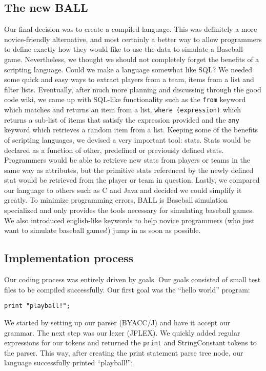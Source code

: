 \subsection{The new BALL}
Our final decision was to create a compiled language. This was
definitely a more novice-friendly alternative, and most certainly a
better way to allow programmers to define exactly how they would like
to use the data to simulate a Baseball game. Nevertheless, we thought
we should not completely forget the benefits of a scripting
language. Could we make a language somewhat like SQL? We needed some
quick and easy ways to extract players from a team, items from a list
and filter lists. Eventually, after much more planning and discussing
through the good code wiki, we came up with SQL-like functionality
such as the \texttt{from} keyword which matches and returns an item from a
list, \texttt{where (expression)} which returns a sub-list of items that
satisfy the expression provided and the \texttt{any} keyword which retrieves
a random item from a list. Keeping some of the benefits of scripting
languages, we devised a very important tool: stats. Stats would be
declared as a function of other, predefined or previously defined
stats. Programmers would be able to retrieve new stats from players or
teams in the same way as attributes, but the primitive stats
referenced by the newly defined stat would be retrieved from the
player or team in question. Lastly, we compared our language to others
such as C and Java and decided we could simplify it greatly. To
minimize programming errors, BALL is Baseball simulation specialized
and only provides the tools necessary for simulating baseball
games. We also introduced english-like keywords to help novice
programmers (who just want to simulate baseball games!) jump in as
soon as possible.

\subsection{Implementation process}
Our coding process was entirely driven by goals. Our goals consisted
of small test files to be compiled successfully. Our first goal was
the ``hello world'' program:

\begin{verbatim}
print "playball!";
\end{verbatim}

We started by setting up our parser (BYACC/J) and have it accept our
grammar. The next step was our lexer (JFLEX). We quickly added regular
expressions for our tokens and returned the \texttt{print} and
StringConstant tokens to the parser. This way, after creating the
print statement parse tree node, our language successfully printed
``playball!'';

